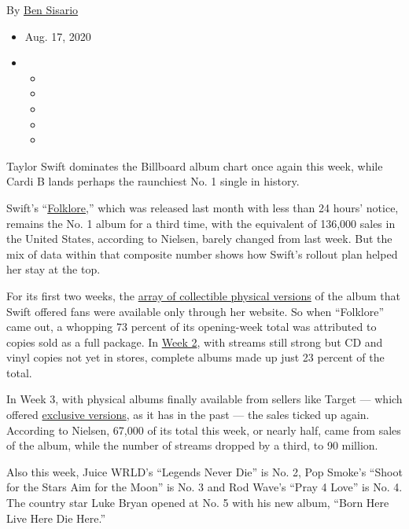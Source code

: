 By \href{https://www.nytimes3xbfgragh.onion/by/ben-sisario}{Ben Sisario}

\begin{itemize}
\item
  Aug. 17, 2020
\item
  \begin{itemize}
  \item
  \item
  \item
  \item
  \item
  \end{itemize}
\end{itemize}

Taylor Swift dominates the Billboard album chart once again this week,
while Cardi B lands perhaps the raunchiest No. 1 single in history.

Swift's
``\href{https://www.nytimes3xbfgragh.onion/2020/07/26/arts/music/taylor-swift-folklore-review.html}{Folklore},''
which was released last month with less than 24 hours' notice, remains
the No. 1 album for a third time, with the equivalent of 136,000 sales
in the United States, according to Nielsen, barely changed from last
week. But the mix of data within that composite number shows how Swift's
rollout plan helped her stay at the top.

For its first two weeks, the
\href{https://www.nytimes3xbfgragh.onion/2020/08/03/arts/music/taylor-swift-folklore-billboard-chart.html}{array
of collectible physical versions} of the album that Swift offered fans
were available only through her website. So when ``Folklore'' came out,
a whopping 73 percent of its opening-week total was attributed to copies
sold as a full package. In
\href{https://www.nytimes3xbfgragh.onion/2020/08/10/arts/music/taylor-swift-folklore-billboard.html}{Week
2}, with streams still strong but CD and vinyl copies not yet in stores,
complete albums made up just 23 percent of the total.

In Week 3, with physical albums finally available from sellers like
Target --- which offered
\href{https://www.target.com/c/taylor-swift/vinyl/-/N-54u4cZvevia}{exclusive
versions}, as it has in the past --- the sales ticked up again.
According to Nielsen, 67,000 of its total this week, or nearly half,
came from sales of the album, while the number of streams dropped by a
third, to 90 million.

Also this week, Juice WRLD's ``Legends Never Die'' is No. 2, Pop Smoke's
``Shoot for the Stars Aim for the Moon'' is No. 3 and Rod Wave's ``Pray
4 Love'' is No. 4. The country star Luke Bryan opened at No. 5 with his
new album, ``Born Here Live Here Die Here.''

